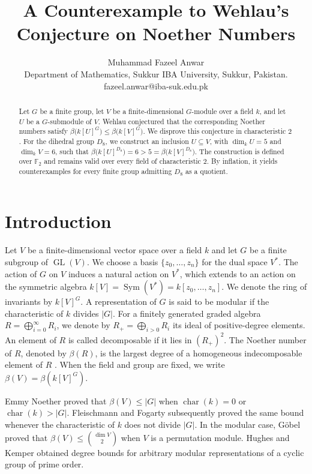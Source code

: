 \documentclass[11pt]{article}
\title{A Counterexample to Wehlau's Conjecture on Noether Numbers}
\author{Muhammad Fazeel Anwar\\
	\small Department of Mathematics, Sukkur IBA University, Sukkur, Pakistan. \\ fazeel.anwar@iba-suk.edu.pk}
\theoremstyle{definition}
\newcommand{\Sym}{\operatorname{Sym}}
\newcommand{\GL}{\operatorname{GL}}
\begin{document}
	
	\maketitle
	
	\begin{abstract}
		Let $G$ be a finite group, let $V$ be a finite-dimensional $G$-module over a field $k$, and let $U$ be a $G$-submodule of $V$. Wehlau conjectured that the corresponding Noether numbers satisfy $\beta\bigl(k[U]^G\bigr)\leq \beta\bigl(k[V]^G\bigr)$. We disprove this conjecture in characteristic $2$. For the dihedral group $D_8$, we construct an inclusion $U\subseteq V$, with $\dim_kU=5$ and $\dim_kV=6$, such that $\beta\bigl(k[U]^{D_8}\bigr)=6>5=\beta\bigl(k[V]^{D_8}\bigr)$.
		The construction is defined over $\mathbb F_2$ and remains valid over every field of characteristic $2$. By inflation, it yields counterexamples for every finite group admitting $D_8$ as a quotient.
	\end{abstract}
	
	
	\section{Introduction}
	Let $V$ be a finite-dimensional vector space over a field $k$ and let $G$ be a finite subgroup of $\GL(V)$. We choose a basis $\{z_0,\ldots,z_n\}$ for the dual space $V^*$. The action of $G$ on $V$ induces a natural action on $V^*$, which extends to an action on the symmetric algebra $k[V]=\Sym(V^*)=k[z_0,\ldots,z_n]$. We denote the ring of invariants by $k[V]^G$. A representation of $G$ is said to be modular if the characteristic of $k$ divides $|G|$. For a finitely generated graded algebra $R=\bigoplus_{i=0}^{\infty}R_i$, we denote by $R_{+}=\bigoplus_{i>0}R_i$ its ideal of positive-degree elements. An element of $R$ is called decomposable if it lies in $(R_{+})^2$. The Noether number of $R$, denoted by $\beta(R)$, is the largest degree of a homogeneous indecomposable element of $R$ \cite{ShWe}. When the field and group are fixed, we write $\beta(V)=\beta(k[V]^G)$.
	
	
	
	Emmy Noether \cite{Noe} proved that $\beta(V)\leq |G|$ when $\operatorname{char}(k)=0$ or $\operatorname{char}(k)>|G|$. Fleischmann \cite{Fl} and Fogarty \cite{F} subsequently proved the same bound whenever the characteristic of $k$ does not divide $|G|$. In the modular case, G\"obel \cite{G} proved that $\beta(V)\leq \binom{\dim V}{2}$ when $V$ is a permutation module. Hughes and Kemper \cite{HK} obtained degree bounds for arbitrary modular representations of a cyclic group of prime order.
	
\end{document}
